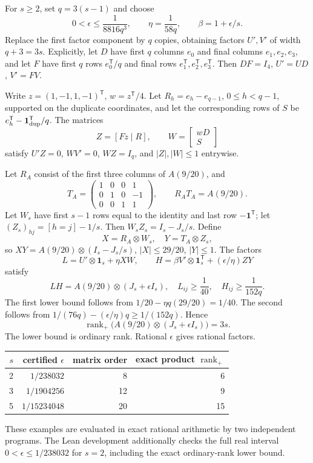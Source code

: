 \documentclass[11pt]{article}
\theoremstyle{definition}\newtheorem{definition}[theorem]{Definition}
\theoremstyle{remark}\newtheorem{remark}[theorem]{Remark}
\newcommand{\rp}{\operatorname{rank}_{+}}
\newcommand{\one}{\mathbf 1}
\begin{document}
For $s\ge2$, set $q=3(s-1)$ and choose
\begin{equation}\label{eq:newconstants}
0<\epsilon\le\frac1{8816q^3},\qquad \eta=\frac1{58q},\qquad\beta=1+\epsilon/s.
\end{equation}
Replace the first factor component by $q$ copies, obtaining factors $U',V'$ of width $q+3=3s$. Explicitly, let $D$ have first $q$ columns $e_0$ and final columns $e_1,e_2,e_3$, and let $F$ have first $q$ rows $e_0^{\mathsf T}/q$ and final rows $e_1^{\mathsf T},e_2^{\mathsf T},e_3^{\mathsf T}$. Then $DF=I_4$, $U'=UD$, $V'=FV$.

Write $z=(1,-1,1,-1)^{\mathsf T}$, $w=z^{\mathsf T}/4$. Let $R_h=e_h-e_{q-1}$, $0\le h<q-1$, supported on the duplicate coordinates, and let the corresponding rows of $S$ be $e_h^{\mathsf T}-\one_{\rm dup}^{\mathsf T}/q$. The matrices
\[
Z=[Fz\mid R],\qquad W=\begin{bmatrix}wD\\ S\end{bmatrix}
\]
satisfy $U'Z=0$, $WV'=0$, $WZ=I_q$, and $|Z|,|W|\le1$ entrywise.

Let $R_A$ consist of the first three columns of $A(9/20)$, and
\[
T_A=\begin{pmatrix}1&0&0&1\\0&1&0&-1\\0&0&1&1\end{pmatrix},\qquad R_AT_A=A(9/20).
\]
Let $W_s$ have first $s-1$ rows equal to the identity and last row $-\one^{\mathsf T}$; let $(Z_s)_{hj}=[h=j]-1/s$. Then $W_sZ_s=I_s-J_s/s$. Define
\[
X=R_A\otimes W_s,\quad Y=T_A\otimes Z_s,
\]
so $XY=A(9/20)\otimes(I_s-J_s/s)$, $|X|\le29/20$, $|Y|\le1$. The factors
\begin{equation}\label{eq:explicitfactors}
L=U'\otimes\one_s+\eta XW,
\qquad H=\beta V'\otimes\one_s^{\mathsf T}+(\epsilon/\eta)ZY
\end{equation}
satisfy
\[
LH=A(9/20)\otimes(J_s+\epsilon I_s),
\quad L_{ij}\ge\frac1{40},\quad H_{ij}\ge\frac1{152q}.
\]
The first lower bound follows from $1/20-\eta q(29/20)=1/40$. The second follows from $1/(76q)-(\epsilon/\eta)q\ge1/(152q)$. Hence
\begin{equation}\label{eq:newexact}
\boxed{\quad\rp\bigl(A(9/20)\otimes(J_s+\epsilon I_s)\bigr)=3s.\quad}
\end{equation}
The lower bound is ordinary rank. Rational $\epsilon$ gives rational factors.

\begin{center}
\begin{tabular}{rrrr}
\toprule
$s$ & certified $\epsilon$ & matrix order & exact product $\rp$\\
\midrule
2 & $1/238032$ & 8 & 6\\
3 & $1/1904256$ & 12 & 9\\
5 & $1/15234048$ & 20 & 15\\
\bottomrule
\end{tabular}
\end{center}
These examples are evaluated in exact rational arithmetic by two independent programs. The Lean development additionally checks the full real interval $0<\epsilon\le1/238032$ for $s=2$, including the exact ordinary-rank lower bound.
\end{document}
